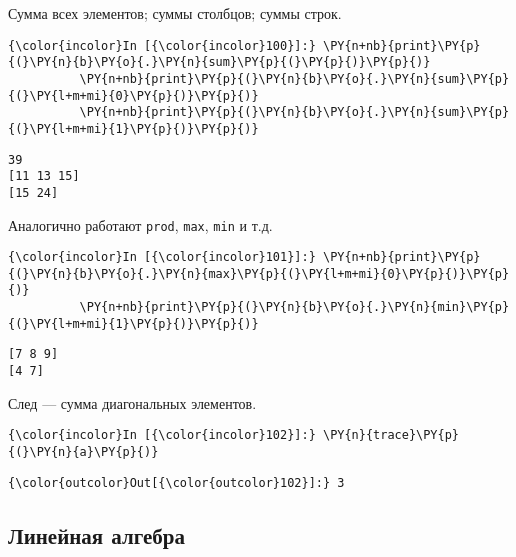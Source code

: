     Сумма всех элементов; суммы столбцов; суммы строк.

    \begin{Verbatim}[commandchars=\\\{\}]
{\color{incolor}In [{\color{incolor}100}]:} \PY{n+nb}{print}\PY{p}{(}\PY{n}{b}\PY{o}{.}\PY{n}{sum}\PY{p}{(}\PY{p}{)}\PY{p}{)}
          \PY{n+nb}{print}\PY{p}{(}\PY{n}{b}\PY{o}{.}\PY{n}{sum}\PY{p}{(}\PY{l+m+mi}{0}\PY{p}{)}\PY{p}{)}
          \PY{n+nb}{print}\PY{p}{(}\PY{n}{b}\PY{o}{.}\PY{n}{sum}\PY{p}{(}\PY{l+m+mi}{1}\PY{p}{)}\PY{p}{)}
\end{Verbatim}

    \begin{Verbatim}[commandchars=\\\{\}]
39
[11 13 15]
[15 24]

    \end{Verbatim}

    Аналогично работают \texttt{prod}, \texttt{max}, \texttt{min} и т.д.

    \begin{Verbatim}[commandchars=\\\{\}]
{\color{incolor}In [{\color{incolor}101}]:} \PY{n+nb}{print}\PY{p}{(}\PY{n}{b}\PY{o}{.}\PY{n}{max}\PY{p}{(}\PY{l+m+mi}{0}\PY{p}{)}\PY{p}{)}
          \PY{n+nb}{print}\PY{p}{(}\PY{n}{b}\PY{o}{.}\PY{n}{min}\PY{p}{(}\PY{l+m+mi}{1}\PY{p}{)}\PY{p}{)}
\end{Verbatim}

    \begin{Verbatim}[commandchars=\\\{\}]
[7 8 9]
[4 7]

    \end{Verbatim}

    След --- сумма диагональных элементов.

    \begin{Verbatim}[commandchars=\\\{\}]
{\color{incolor}In [{\color{incolor}102}]:} \PY{n}{trace}\PY{p}{(}\PY{n}{a}\PY{p}{)}
\end{Verbatim}

            \begin{Verbatim}[commandchars=\\\{\}]
{\color{outcolor}Out[{\color{outcolor}102}]:} 3
\end{Verbatim}
        
\subsection{Линейная алгебра}
\label{numpy4}

